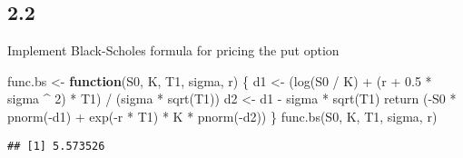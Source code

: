 \documentclass[
]{article}
\newenvironment{Shaded}{\begin{snugshade}}{\end{snugshade}}
\newcommand{\ControlFlowTok}[1]{\textcolor[rgb]{0.13,0.29,0.53}{\textbf{#1}}}
\newcommand{\DecValTok}[1]{\textcolor[rgb]{0.00,0.00,0.81}{#1}}
\newcommand{\FloatTok}[1]{\textcolor[rgb]{0.00,0.00,0.81}{#1}}
\newcommand{\FunctionTok}[1]{\textcolor[rgb]{0.00,0.00,0.00}{#1}}
\newcommand{\NormalTok}[1]{#1}
\newcommand{\OtherTok}[1]{\textcolor[rgb]{0.56,0.35,0.01}{#1}}
\newcommand{\SpecialCharTok}[1]{\textcolor[rgb]{0.00,0.00,0.00}{#1}}
\begin{document}
\hypertarget{section-6}{%
\subsection{2.2}\label{section-6}}

Implement Black-Scholes formula for pricing the put option

\begin{Shaded}
\begin{Highlighting}[]
\NormalTok{func.bs }\OtherTok{\textless{}{-}} \ControlFlowTok{function}\NormalTok{(S0, K, T1, sigma, r) \{}
\NormalTok{  d1 }\OtherTok{\textless{}{-}}\NormalTok{ (}\FunctionTok{log}\NormalTok{(S0 }\SpecialCharTok{/}\NormalTok{ K) }\SpecialCharTok{+}\NormalTok{ (r }\SpecialCharTok{+} \FloatTok{0.5} \SpecialCharTok{*}\NormalTok{ sigma }\SpecialCharTok{\^{}} \DecValTok{2}\NormalTok{) }\SpecialCharTok{*}\NormalTok{ T1) }\SpecialCharTok{/}\NormalTok{ (sigma }\SpecialCharTok{*} \FunctionTok{sqrt}\NormalTok{(T1))}
\NormalTok{  d2 }\OtherTok{\textless{}{-}}\NormalTok{ d1 }\SpecialCharTok{{-}}\NormalTok{ sigma }\SpecialCharTok{*} \FunctionTok{sqrt}\NormalTok{(T1)}
  \FunctionTok{return}\NormalTok{ (}\SpecialCharTok{{-}}\NormalTok{S0 }\SpecialCharTok{*} \FunctionTok{pnorm}\NormalTok{(}\SpecialCharTok{{-}}\NormalTok{d1) }\SpecialCharTok{+} \FunctionTok{exp}\NormalTok{(}\SpecialCharTok{{-}}\NormalTok{r }\SpecialCharTok{*}\NormalTok{ T1) }\SpecialCharTok{*}\NormalTok{ K }\SpecialCharTok{*} \FunctionTok{pnorm}\NormalTok{(}\SpecialCharTok{{-}}\NormalTok{d2))}
\NormalTok{\}}
\FunctionTok{func.bs}\NormalTok{(S0, K, T1, sigma, r)}
\end{Highlighting}
\end{Shaded}

\begin{verbatim}
## [1] 5.573526
\end{verbatim}
\end{document}
